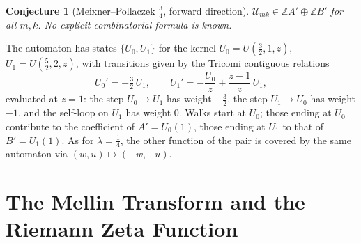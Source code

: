 \documentclass[11pt,a4paper]{article}
\newtheorem{conjecture}[theorem]{Conjecture}
\theoremstyle{definition}
\newcommand{\Z}{\mathbb{Z}}
\begin{document}
\begin{tcolorbox}[colback=blue!5, colframe=blue!5, boxrule=0pt, sharp corners]
\begin{conjecture}[Meixner--Pollaczek $\tfrac34$, forward direction]
\label{conj:mp34}
$\mathcal U_{mk} \in \Z A' \oplus \Z B'$ for all $m, k$. No explicit
combinatorial formula is known.
\end{conjecture}
\end{tcolorbox}

The automaton has states $\{U_0, U_1\}$ for the kernel
$U_0 = U(\tfrac32, 1, z)$, $U_1 = U(\tfrac52, 2, z)$, with
transitions given by the Tricomi contiguous relations
\[
  U_0' = -\tfrac32\, U_1, \qquad
  U_1' = -\frac{U_0}{z} + \frac{z-1}{z}\, U_1 ,
\]
evaluated at $z = 1$: the step $U_0 \to U_1$ has weight $-\tfrac32$,
the step $U_1 \to U_0$ has weight $-1$, and the self-loop on $U_1$
has weight $0$. Walks start at $U_0$; those ending at $U_0$
contribute to the coefficient of $A' = U_0(1)$, those ending at
$U_1$ to that of $B' = U_1(1)$. As for $\lambda = \tfrac14$, the
other function of the pair is covered by the same automaton via
$(w,u) \mapsto (-w,-u)$.

\section{The Mellin Transform and the Riemann Zeta Function}
\end{document}
